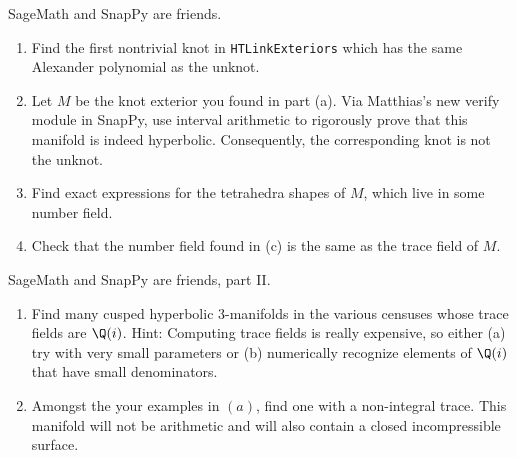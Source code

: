 \documentclass[tikz, a4paper]{nmd/hw}
\begin{document}
\begin{problems}
\item SageMath and SnapPy are friends.
  \begin{enumerate}
  \item Find the first nontrivial knot in \texttt{HTLinkExteriors}
    which has the same Alexander polynomial as the unknot.

  \item Let $M$ be the knot exterior you found in part (a).  Via
    Matthias's new verify module in SnapPy, use interval arithmetic to
    rigorously prove that this manifold is indeed hyperbolic.
    Consequently, the corresponding knot is not the unknot. 

  \item Find exact expressions for the tetrahedra shapes of
    $M$, which live in some number field.  

  \item Check that the number field found in (c) is the same as the
    trace field of $M$.  
  \end{enumerate}

\item SageMath and SnapPy are friends, part II.
  \begin{enumerate}
    \item Find many cusped hyperbolic 3-manifolds in the various
      censuses whose trace fields are $\Q(i)$.  Hint: Computing trace
      fields is really expensive, so either (a) try with very small
      parameters or (b) numerically recognize elements of $\Q(i)$ that
      have small denominators.

    \item Amongst the your examples in $(a)$, find one with a 
      non-integral trace.  This manifold will not be arithmetic and
      will also contain a closed incompressible surface.  
  \end{enumerate}

\end{problems}
\end{document}
